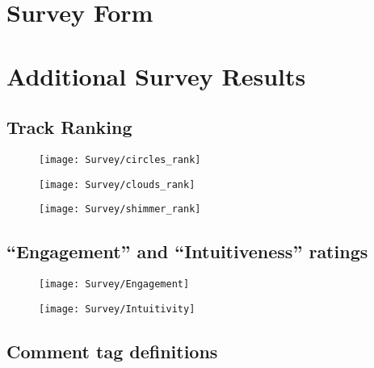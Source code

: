 \documentclass[../initial_thesis.tex]{subfiles}
\begin{document}
\chapter{Survey Form} \label{appendix:survey}


\chapter{Additional Survey Results}
\section{Track Ranking} \label{appendix:ranking}
\begin{figure}[!htb]
  \centering
  \texttt{[image: Survey/circles\_rank]}
\end{figure}
\begin{figure}[!htb]
  \centering
  \texttt{[image: Survey/clouds\_rank]}
\end{figure}
\begin{figure}[!htb]
  \centering
  \texttt{[image: Survey/shimmer\_rank]}
\end{figure}

\section{``Engagement'' and ``Intuitiveness'' ratings} \label{appendix:participant_ratings}
\begin{figure}[!htb]
  \centering
  \texttt{[image: Survey/Engagement]}
\end{figure}
\begin{figure}[!htb]
  \centering
  \texttt{[image: Survey/Intuitivity]}
\end{figure}

\section{Comment tag definitions} \label{appendix:tagdefs}
\end{document}
